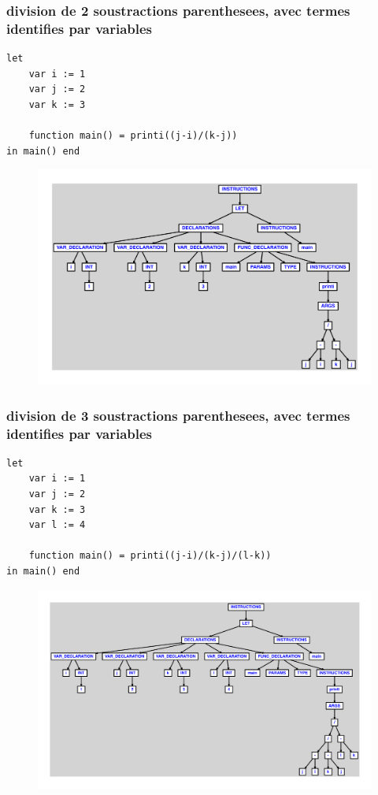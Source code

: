 \documentclass{article}
\begin{document}
\subsubsection{division de 2 soustractions parenthesees, avec termes identifies par variables}
\begin{lstlisting}
let
	var i := 1
	var j := 2
	var k := 3

	function main() = printi((j-i)/(k-j))
in main() end
\end{lstlisting}
\newpage
\begin{figure}[H]
\centering
\includegraphics[max width=\textwidth]{ast/ast_129.pdf}
\end{figure}
\newpage
\subsubsection{division de 3 soustractions parenthesees, avec termes identifies par variables}
\begin{lstlisting}
let
	var i := 1
	var j := 2
	var k := 3
	var l := 4

	function main() = printi((j-i)/(k-j)/(l-k))
in main() end
\end{lstlisting}
\newpage
\begin{figure}[H]
\centering
\includegraphics[max width=\textwidth]{ast/ast_130.pdf}
\end{figure}
\newpage
\end{document}
